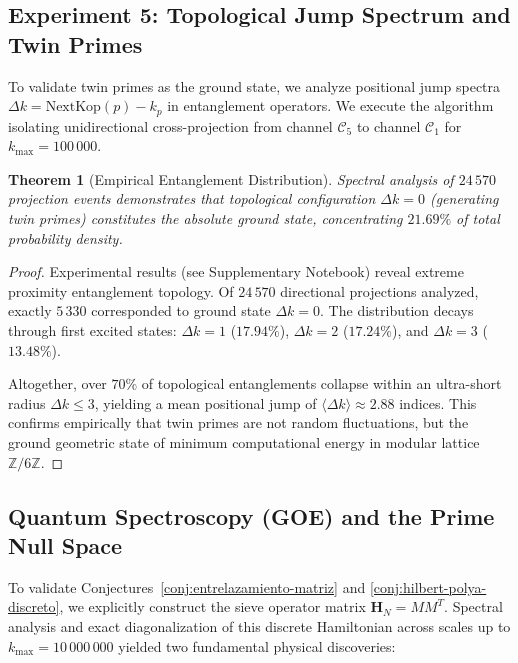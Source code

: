 \documentclass{article}
\numberwithin{equation}{section}
\theoremstyle{plain}
\newtheorem{theorem}{Theorem}[section]
\theoremstyle{definition}
\begin{document}
\subsection{Experiment 5: Topological Jump Spectrum and Twin Primes}

To validate twin primes as the ground state, we analyze positional jump spectra $\Delta k = \mathrm{NextKop}(p) - k_p$ in entanglement operators. We execute the algorithm isolating unidirectional cross-projection from channel $\mathcal{C}_5$ to channel $\mathcal{C}_1$ for $k_{\max} = 100\,000$.

\begin{theorem}[Empirical Entanglement Distribution]
\label{thm:distribucion-gemelos}
Spectral analysis of $24\,570$ projection events demonstrates that topological configuration $\Delta k = 0$ (generating twin primes) constitutes the absolute ground state, concentrating $21.69\%$ of total probability density.
\end{theorem}

\begin{proof}
Experimental results (see Supplementary Notebook) reveal extreme proximity entanglement topology. Of $24\,570$ directional projections analyzed, exactly $5\,330$ corresponded to ground state $\Delta k = 0$. The distribution decays through first excited states: $\Delta k = 1$ ($17.94\%$), $\Delta k = 2$ ($17.24\%$), and $\Delta k = 3$ ($13.48\%$).

Altogether, over $70\%$ of topological entanglements collapse within an ultra-short radius $\Delta k \le 3$, yielding a mean positional jump of $\langle \Delta k \rangle \approx 2.88$ indices. This confirms empirically that twin primes are not random fluctuations, but the ground geometric state of minimum computational energy in modular lattice $\mathbb{Z}/6\mathbb{Z}$.
\end{proof}

\subsection{Quantum Spectroscopy (GOE) and the Prime Null Space}
\label{subsec:exp6-espectroscopia}

To validate Conjectures~\ref{conj:entrelazamiento-matriz} and \ref{conj:hilbert-polya-discreto}, we explicitly construct the sieve operator matrix $\mathbf{H}_N = M M^T$. Spectral analysis and exact diagonalization of this discrete Hamiltonian across scales up to $k_{\max} = 10\,000\,000$ yielded two fundamental physical discoveries:
\end{document}

